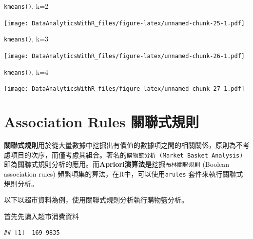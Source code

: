 \documentclass[
]{book}
\newenvironment{Shaded}{\begin{snugshade}}{\end{snugshade}}
\newcommand{\CommentTok}[1]{\textcolor[rgb]{0.56,0.35,0.01}{\textit{#1}}}
\newcommand{\ControlFlowTok}[1]{\textcolor[rgb]{0.13,0.29,0.53}{\textbf{#1}}}
\newcommand{\KeywordTok}[1]{\textcolor[rgb]{0.13,0.29,0.53}{\textbf{#1}}}
\newcommand{\NormalTok}[1]{#1}
\newcommand{\OperatorTok}[1]{\textcolor[rgb]{0.81,0.36,0.00}{\textbf{#1}}}
\newcommand{\StringTok}[1]{\textcolor[rgb]{0.31,0.60,0.02}{#1}}
\begin{document}
\texttt{kmeans()}, k=2

\texttt{[image: DataAnalyticsWithR\_files/figure-latex/unnamed-chunk-25-1.pdf]}

\texttt{kmeans()}, k=3

\texttt{[image: DataAnalyticsWithR\_files/figure-latex/unnamed-chunk-26-1.pdf]}

\texttt{kmeans()}, k=4

\texttt{[image: DataAnalyticsWithR\_files/figure-latex/unnamed-chunk-27-1.pdf]}

\hypertarget{association-rules-ux95dcux806fux5f0fux898fux5247}{%
\section{Association Rules 關聯式規則}\label{association-rules-ux95dcux806fux5f0fux898fux5247}}

\textbf{關聯式規則}用於從大量數據中挖掘出有價值的數據項之間的相關關係，原則為不考慮項目的次序，而僅考慮其組合。著名的\texttt{購物籃分析\ (Market\ Basket\ Analysis)}即為關聯式規則分析的應用。而\textbf{Apriori演算法}是挖掘\texttt{布林關聯規則} (Boolean association rules) 頻繁項集的算法，在R中，可以使用\texttt{arules}\citep{R-arules} 套件來執行關聯式規則分析。

以下以超市資料為例，使用關聯式規則分析執行購物籃分析。

首先先讀入超市消費資料

\begin{Shaded}
\end{Shaded}

\begin{verbatim}
## [1]  169 9835
\end{verbatim}
\end{document}

